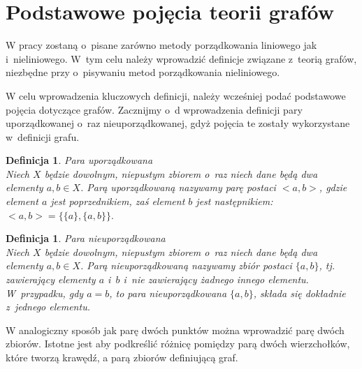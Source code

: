 \documentclass[12pt,a4paper]{report}
\newtheorem{definition}[theorem]{Definicja}
\begin{document}
\section{Podstawowe pojęcia teorii grafów}\label{grafy} %
W pracy zostaną o~pisane zarówno metody porządkowania liniowego jak i~nieliniowego. W~tym celu należy wprowadzić definicje związane z~teorią grafów, niezbędne przy o~pisywaniu metod porządkowania nieliniowego.


W celu wprowadzenia kluczowych definicji, należy wcześniej podać podstawowe pojęcia dotyczące grafów. Zacznijmy o~d wprowadzenia definicji pary uporządkowanej o~raz nieuporządkowanej, gdyż pojęcia te zostały wykorzystane w~definicji grafu.



\begin{definition}{Para uporządkowana \cite[w o~parciu o~ rozdział 3]{kuratowski2004}}\\
Niech $X$ będzie dowolnym, niepustym zbiorem o~raz niech dane będą dwa elementy $a,b \in X$. Parą uporządkowaną nazywamy parę postaci $<a,b>$, gdzie element $a$ jest poprzednikiem, zaś element $b$ jest następnikiem: $<a,b>=\{\{a\},\{a,b\}\}.$
\end{definition}

\begin{definition}{Para nieuporządkowana \cite[w o~parciu o~ rozdział 3]{kuratowski2004}}\\
Niech $X$ będzie dowolnym, niepustym zbiorem o~raz niech dane będą dwa elementy $a,b \in X$. Parą nieuporządkowaną nazywamy zbiór postaci $\{a,b\}$, tj. zawierający elementy $a$ i~$b$ i~nie zawierający żadnego innego elementu. W~przypadku, gdy $a=b$, to para nieuporządkowana $\{a,b\}$, składa się dokładnie z~jednego elementu.
\end{definition}

W analogiczny sposób jak parę dwóch punktów można wprowadzić parę dwóch zbiorów. Istotne jest aby podkreślić różnicę pomiędzy parą dwóch wierzchołków, które tworzą krawędź, a parą zbiorów definiującą graf. 
\end{document}
